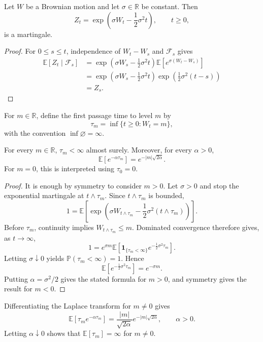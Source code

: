 \begin{thm}
Let $W$ be a Brownian motion and let $\sigma\in\mathbb{R}$ be constant. Then
\[
Z_t=\exp\left(\sigma W_t-\frac12\sigma^2t\right),
\qquad t\geq 0,
\]
is a martingale.
\end{thm}

\begin{proof}
For $0\leq s\leq t$, independence of $W_t-W_s$ and $\mathcal{F}_s$ gives
\[
\begin{aligned}
\mathbb{E}[Z_t\mid\mathcal{F}_s]
&=
\exp\left(\sigma W_s-\frac12\sigma^2t\right)
\mathbb{E}\left[e^{\sigma(W_t-W_s)}\right]\\
&=
\exp\left(\sigma W_s-\frac12\sigma^2t\right)
\exp\left(\frac12\sigma^2(t-s)\right)\\
&=Z_s.
\end{aligned}
\]
\end{proof}

\begin{de}
For $m\in\mathbb{R}$, define the first passage time to level $m$ by
\[
\tau_m=\inf\{t\geq 0:W_t=m\},
\]
with the convention $\inf\varnothing=\infty$.
\end{de}

\begin{thm}
For every $m\in\mathbb{R}$, $\tau_m<\infty$ almost surely. Moreover, for every $\alpha>0$,
\[
\mathbb{E}\left[e^{-\alpha\tau_m}\right]
=e^{-|m|\sqrt{2\alpha}}.
\]
For $m=0$, this is interpreted using $\tau_0=0$.
\end{thm}

\begin{proof}
It is enough by symmetry to consider $m>0$. Let $\sigma>0$ and stop the exponential martingale at $t\wedge\tau_m$. Since $t\wedge\tau_m$ is bounded,
\[
1
=
\mathbb{E}\left[
\exp\left(
\sigma W_{t\wedge\tau_m}
-\frac12\sigma^2(t\wedge\tau_m)
\right)
\right].
\]
Before $\tau_m$, continuity implies $W_{t\wedge\tau_m}\leq m$. Dominated convergence therefore gives, as $t\to\infty$,
\[
1
=
e^{\sigma m}
\mathbb{E}\left[
\mathbf{1}_{\{\tau_m<\infty\}}
e^{-\frac12\sigma^2\tau_m}
\right].
\]
Letting $\sigma\downarrow 0$ yields $\mathbb{P}(\tau_m<\infty)=1$. Hence
\[
\mathbb{E}\left[e^{-\frac12\sigma^2\tau_m}\right]
=e^{-\sigma m}.
\]
Putting $\alpha=\sigma^2/2$ gives the stated formula for $m>0$, and symmetry gives the result for $m<0$.
\end{proof}

\begin{remark}
Differentiating the Laplace transform for $m\neq 0$ gives
\[
\mathbb{E}\left[\tau_m e^{-\alpha\tau_m}\right]
=
\frac{|m|}{\sqrt{2\alpha}}
 e^{-|m|\sqrt{2\alpha}},
\qquad \alpha>0.
\]
Letting $\alpha\downarrow 0$ shows that $\mathbb{E}[\tau_m]=\infty$ for $m\neq 0$.
\end{remark}

